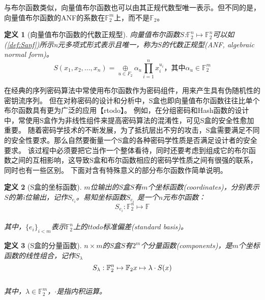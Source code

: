 \documentclass{xduugthesis}
\newtheorem{definition}{定义}
\begin{document}
与布尔函数类似，向量值布尔函数也可以由其正规代数型唯一表示。但不同的是，向量值布尔函数的ANF的系数在$\mathbb{F}_2^m$上，而不是$\mathbb{F}_2$。
\begin{definition}[向量值布尔函数的代数正规型]
    向量值布尔函数$S$:$\mathbb{F}_2^n \mapsto \mathbb{F}_2^n$可以如(\ref{def:Sanf})所示n元多项式形式表示且唯一，称为$S$的代数正规型(ANF, algebraic normal form)。
    \begin{equation}
        S(x_1,x_2,\dots ,x_n) = \mathop{\oplus}\limits_{u \in F_2}\alpha_u \prod\limits_{i=1}^n x_i^{u_i}\mbox{，其中}\alpha_u \in \mathbb{F}_2^m \label{def:Sanf}
    \end{equation}
\end{definition}\par

在经典的序列密码算法中常使用布尔函数作为密码组件，用来产生具有伪随机性的密钥流序列。
但在对称密码的设计和分析中，S盒也即向量值布尔函数往往比单个布尔函数具有更为广泛的应用【rtodo】。
例如，在分组密码和Hash函数的设计中，常使用S盒作为非线性组件来提高密码算法的混淆性，可见S盒的安全性愈加重要。
随着密码学技术的不断发展，为了抵抗层出不穷的攻击，S盒需要满足不同的安全性要求。那么自然要衡量一个S盒的各种密码学性质是否满足设计者的安全要求。
该过程中必须要把它当作一个整体看待，同时还要考虑到组成它的布尔函数之间的互相影响，这导致S盒和布尔函数相应的密码学性质之间有很强的联系，同时也有一些区别。
下面对含有特殊意义的部分布尔函数作简单说明。\par

\begin{definition}[S盒的坐标函数]
    $m$位输出的S盒$S$有$m$个坐标函数(\emph{coordinates})，分别表示$S$的第i位输出，记作$S_{e_i}$。易知坐标函数$S_{e_i}$
    是一个$n$元布尔函数：
    $$
    S_{e_i}:\mathbb{F}_2^n \mapsto \mathbb{F}
    $$\\
    其中，$\{e_i\}_{i<m}$表示$\mathbb{F}_2^n$上的ttodo标准偏差(\emph{standard basis})。
\end{definition}\par

\begin{definition}[S盒的分量函数]
    $n \times m$的S盒$S$有$2^m$个分量函数(\emph{components})，是$m$个坐标函数的线性组合，记作$S_{\lambda}$
    $$
    S_{\lambda}:\mathbb{F}_2^n \mapsto \mathbb{F}_2 \\
    x \mapsto \lambda \cdot S(x)
    $$\\
    其中，$\lambda \in \mathbb{F}_2^m $，$\cdot$是指内积运算。
\end{definition}\par
\end{document}
